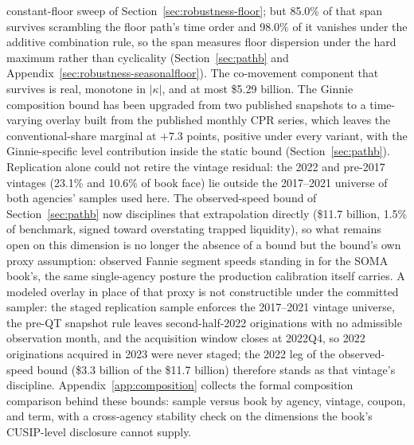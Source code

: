 \documentclass[12pt]{article}
\begin{document}
constant-floor sweep of Section~\ref{sec:robustness-floor}; but 85.0\% of that span survives scrambling the floor path's time order and 98.0\% of it vanishes under the additive combination rule, so the span measures floor dispersion under the hard maximum rather than cyclicality (Section~\ref{sec:pathb} and Appendix~\ref{sec:robustness-seasonalfloor}). The co-movement component that survives is real, monotone in $|\kappa|$, and at most \$5.29 billion. The Ginnie composition bound has been upgraded from two published snapshots to a time-varying overlay built from the published monthly CPR series, which leaves the conventional-share marginal at $+7.3$ points, positive under every variant, with the Ginnie-specific level contribution inside the static bound (Section~\ref{sec:pathb}). Replication alone could not retire the vintage residual: the 2022 and pre-2017 vintages (23.1\% and 10.6\% of book face) lie outside the 2017--2021 universe of both agencies' samples used here. The observed-speed bound of Section~\ref{sec:pathb} now disciplines that extrapolation directly (\$11.7 billion, 1.5\% of benchmark, signed toward overstating trapped liquidity), so what remains open on this dimension is no longer the absence of a bound but the bound's own proxy assumption: observed Fannie segment speeds standing in for the SOMA book's, the same single-agency posture the production calibration itself carries. A modeled overlay in place of that proxy is not constructible under the committed sampler: the staged replication sample enforces the 2017--2021 vintage universe, the pre-QT snapshot rule leaves second-half-2022 originations with no admissible observation month, and the acquisition window closes at 2022Q4, so 2022 originations acquired in 2023 were never staged; the 2022 leg of the observed-speed bound (\$3.3 billion of the \$11.7 billion) therefore stands as that vintage's discipline. Appendix~\ref{app:composition} collects the formal composition comparison behind these bounds: sample versus book by agency, vintage, coupon, and term, with a cross-agency stability check on the dimensions the book's CUSIP-level disclosure cannot supply.
\end{document}
